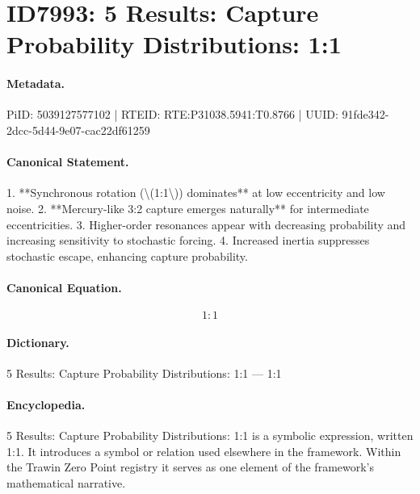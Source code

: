 \section*{ID7993: 5 Results: Capture Probability Distributions: 1:1}
\paragraph{Metadata.}
PiID: 5039127577102 | RTEID: RTE:P31038.5941:T0.8766 | UUID: 91fde342-2dcc-5d44-9e07-cac22df61259

\paragraph{Canonical Statement.}
1. **Synchronous rotation (\textbackslash{}(1:1\textbackslash{})) dominates** at low eccentricity and low noise. 2. **Mercury-like 3:2 capture emerges naturally** for intermediate eccentricities. 3. Higher-order resonances appear with decreasing probability and increasing sensitivity to stochastic forcing. 4. Increased inertia suppresses stochastic escape, enhancing capture probability.

\paragraph{Canonical Equation.}
\[
1:1
\]

\paragraph{Dictionary.}
5 Results: Capture Probability Distributions: 1:1 — 1:1

\paragraph{Encyclopedia.}
5 Results: Capture Probability Distributions: 1:1 is a symbolic expression, written 1:1. It introduces a symbol or relation used elsewhere in the framework. Within the Trawin Zero Point registry it serves as one element of the framework's mathematical narrative.
